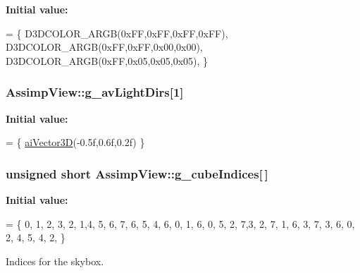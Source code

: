 {\bfseries Initial value\+:}
\begin{DoxyCode}
= 
\{
    D3DCOLOR\_ARGB(0xFF,0xFF,0xFF,0xFF),
    D3DCOLOR\_ARGB(0xFF,0xFF,0x00,0x00),
    D3DCOLOR\_ARGB(0xFF,0x05,0x05,0x05),
\}
\end{DoxyCode}
\hypertarget{namespace_assimp_view_a8dd2ce06bec8d9560c917005cba476a1}{
\subsubsection[{g\+\_\+av\+Light\+Dirs}]{ Assimp\+View\+::g\+\_\+av\+Light\+Dirs\mbox{[}1\mbox{]}}}\label{namespace_assimp_view_a8dd2ce06bec8d9560c917005cba476a1}
{\bfseries Initial value\+:}
\begin{DoxyCode}
= 
\{   \hyperlink{structai_vector3_d}{aiVector3D}(-0.5f,0.6f,0.2f)  \}
\end{DoxyCode}
\hypertarget{namespace_assimp_view_a11de3131b31c9e8a1371ae1f8ec30537}{
\subsubsection[{g\+\_\+cube\+Indices}]{\setlength{\rightskip}{0pt plus 5cm}unsigned short Assimp\+View\+::g\+\_\+cube\+Indices\mbox{[}$\,$\mbox{]}}}\label{namespace_assimp_view_a11de3131b31c9e8a1371ae1f8ec30537}
{\bfseries Initial value\+:}
\begin{DoxyCode}
=
\{
    0, 1, 2, 3, 2, 1,4, 5, 6,
    7, 6, 5, 4, 6,  0, 1, 6, 0, 
    5, 2, 7,3, 2, 7, 1, 6, 3,
    7, 3, 6, 0, 2, 4, 5, 4, 2,  
\}
\end{DoxyCode}


Indices for the skybox. 

